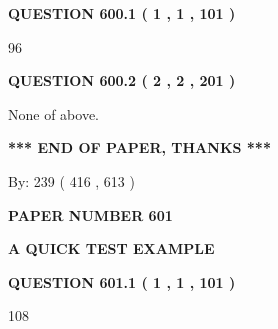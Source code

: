 \documentclass[12pt]{article}
\begin{document}
{\textbf{\Large{QUESTION
600.1 
 ( 1 , 1 , 101 )
}}}
  
  
 
 
\noindent{}

96
 
 
  
\vspace{0.2in}
  
{\textbf{\Large{QUESTION
600.2 
 ( 2 , 2 , 201 )
}}}
  
  
 
 
\noindent{}
 
 
 None of above.
 
 
 
 
   
   
 \vspace{0.2in}
 
   
   
   
   
\vspace{1.0in} 
{\textbf{\large{ *** END OF PAPER, THANKS *** }}} 
   
   
\hspace{1.0in} By: 
 239 ( 416 ,  613 )
   
   
   
   
\newpage 
\setcounter{page}{ 
   601001 } 
   
   
   
   
 {\textbf{ \Large{ PAPER NUMBER  601  }}}
   
   
\vspace{0.2in}
   
   
   
   
   
   
 \vspace{0.2in}
{\LARGE {\textbf{ A QUICK TEST EXAMPLE}}}
   
   
  
\vspace{0.2in}
  
{\textbf{\Large{QUESTION
601.1 
 ( 1 , 1 , 101 )
}}}
  
  
 
 
\noindent{}

108
 
\end{document}
